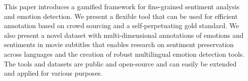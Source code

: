 This paper introduces a gamified framework for fine-grained sentiment analysis and emotion detection. We present a flexible tool that can be used for efficient annotation based on crowd sourcing and a self-perpetuating gold standard. We also present a novel dataset with multi-dimensional annotations of emotions and sentiments in movie subtitles that enables research on sentiment preservation across languages and the creation of robust multilingual emotion detection tools. The tools and datasets are public and open-source and can easily be extended and applied for various purposes.
